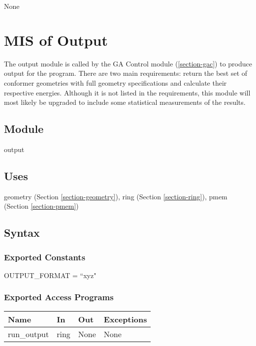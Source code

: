 \documentclass[12pt, titlepage]{article}
\begin{document}
None

\newpage

\section{MIS of Output} \label{section-output}

The output module is called by the GA Control module (\ref{section-gac}) to 
produce output for the program. There are two main requirements: return the 
best set of conformer geometries with full geometry specifications and 
calculate their respective energies. Although it is not listed in the 
requirements, this module will most likely be upgraded to include some 
statistical measurements of the results.

\subsection{Module}

output

\subsection{Uses}

geometry (Section \ref{section-geometry}),
ring (Section \ref{section-ring}),
pmem (Section \ref{section-pmem})

\subsection{Syntax}

\subsubsection{Exported Constants}

OUTPUT\_FORMAT = ``xyz"

\subsubsection{Exported Access Programs}

\begin{center}
	\begin{tabular}{p{2cm} p{4cm} p{4cm} p{2cm}}
		\hline
		\textbf{Name} & \textbf{In} & \textbf{Out} & \textbf{Exceptions} \\
		\hline
		run\_output & ring & None & None \\
		\hline
	\end{tabular}
\end{center}
\end{document}
